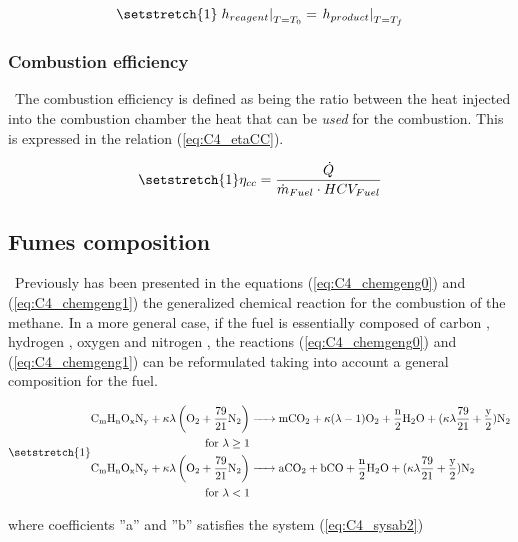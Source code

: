 \begin{equation}
    \setstretch{1}
    \left.h_{reagent}\right|_{T=T_0} = \left.h_{product}\right|_{T=T_f}\label{eq:C4_T_f}
\end{equation}

\subsubsection{Combustion efficiency}
\quad\ The combustion efficiency is defined as being the ratio between the heat injected into the combustion chamber the heat that can be \textit{used} for the combustion. This is expressed in the relation (\ref{eq:C4_etaCC}).

\begin{equation}
    \setstretch{1}
    \eta_{cc} = \frac{\dot{Q}}{\dot{m}_{Fuel}\cdot HCV_{Fuel}}\label{eq:C4_etaCC}
\end{equation}
\subsection{Fumes composition}
\quad\ Previously has been presented in the equations (\ref{eq:C4_chemgeng0}) and (\ref{eq:C4_chemgeng1}) the generalized chemical reaction for the combustion of the methane.
In a more general case, if the fuel is essentially composed of carbon , hydrogen , oxygen  and nitrogen , the reactions (\ref{eq:C4_chemgeng0}) and (\ref{eq:C4_chemgeng1}) can be reformulated taking into account a general composition for the fuel.

\begin{subequations}
    \setstretch{1}
 \begin{align}
     \ce{C_{\text{m}}H_{\text{n}}O_{\text{x}}N_{\text{y}} +}\kappa\lambda \left(\ce{O2}+\frac{79}{21}\ce{N2}\right) &\ce{-> mCO2 +} \kappa(\lambda-1)\ce{O2 + \frac{n}{2}H2O +} (\kappa\lambda\frac{79}{21} + \frac{\text{y}}{2})\ce{N2}\\
     \text{ for \(\lambda\geq 1\)}\nonumber\\
     \ce{C_{\text{m}}H_{\text{n}}O_{\text{x}}N_{\text{y}} +}\kappa\lambda \left(\ce{O2}+\frac{79}{21}\ce{N2}\right) &\ce{-> aCO2 + bCO + \frac{n}{2}H2O} + (\kappa\lambda\frac{79}{21} + \frac{\text{y}}{2})\ce{N2}\\
     \text{ for \(\lambda< 1\)}\nonumber
 \end{align}
        \label{eq:C4_chemgeng01}
\end{subequations}

where coefficients ''a'' and ''b'' satisfies the system (\ref{eq:C4_sysab2})


